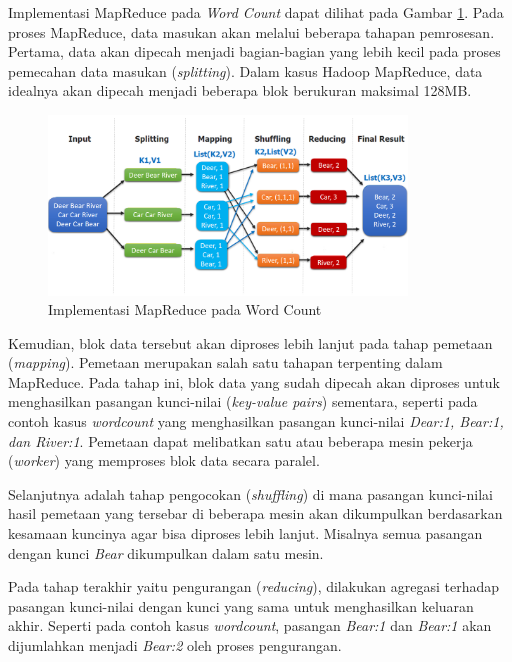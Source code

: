Implementasi MapReduce pada \textit{Word Count}\cite{KOMPARASIKECEPATANHADOOP} dapat dilihat pada Gambar \ref{fig:mapreduce-wordcount}. Pada proses MapReduce, data masukan akan melalui beberapa tahapan pemrosesan. Pertama, data akan dipecah menjadi bagian-bagian yang lebih kecil pada proses pemecahan data masukan (\textit{splitting}). Dalam kasus Hadoop MapReduce, data idealnya akan dipecah menjadi beberapa blok berukuran maksimal 128MB.

\begin{figure}[h]
    \centering
    \includegraphics[width=0.85\textwidth]{figures/ch02/map-reduce-word-count-oreilly.png}
    \caption{Implementasi MapReduce pada Word Count \cite{MapReduceDistributedComputing}}
    \label{fig:mapreduce-wordcount}
\end{figure}

Kemudian, blok data tersebut akan diproses lebih lanjut pada tahap pemetaan (\textit{mapping}). Pemetaan merupakan salah satu tahapan terpenting dalam MapReduce. Pada tahap ini, blok data yang sudah dipecah akan diproses untuk menghasilkan pasangan kunci-nilai (\textit{key-value pairs}) sementara, seperti pada contoh kasus \textit{wordcount} yang menghasilkan pasangan kunci-nilai \textit{Dear:1, Bear:1, dan River:1}. Pemetaan dapat melibatkan satu atau beberapa mesin pekerja (\textit{worker}) yang memproses blok data secara paralel.

Selanjutnya adalah tahap pengocokan (\textit{shuffling}) di mana pasangan kunci-nilai hasil pemetaan yang tersebar di beberapa mesin akan dikumpulkan berdasarkan kesamaan kuncinya agar bisa diproses lebih lanjut. Misalnya semua pasangan dengan kunci \textit{Bear} dikumpulkan dalam satu mesin.

Pada tahap terakhir yaitu pengurangan (\textit{reducing}), dilakukan agregasi terhadap pasangan kunci-nilai dengan kunci yang sama untuk menghasilkan keluaran akhir. Seperti pada contoh kasus \textit{wordcount}, pasangan \textit{Bear:1} dan \textit{Bear:1} akan dijumlahkan menjadi \textit{Bear:2} oleh proses pengurangan.

